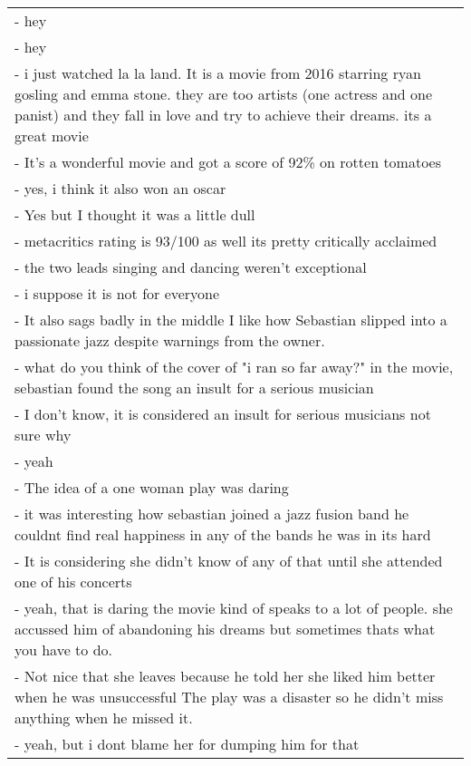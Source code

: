 \documentclass[11pt]{article}
\begin{document}
\begin{table*}[h]
    \centering
    \small
    \begin{tabular}{p{\textwidth}}
    \toprule
        - hey  \\
        - hey \\
        - i just watched la la land. It is a movie from 2016 starring ryan gosling and emma stone. they are too artists (one actress and one panist) and they fall in love and try to achieve their dreams. its a great movie \\
        - It's a wonderful movie and got a score of 92\% on rotten tomatoes \\
        - yes, i think it also won an oscar \\
        - Yes but I thought it was a little dull \\
        - metacritics rating is 93/100 as well its pretty critically acclaimed \\
        - the two leads singing and dancing weren't exceptional \\
        - i suppose it is not for everyone \\
        - It also sags badly in the middle  I like how Sebastian slipped into a passionate jazz despite warnings from the owner. \\
        - what do you think of the cover of "i ran so far away?"  in the movie, sebastian found the song an insult for a serious musician \\
        - I don't know, it is considered an insult for serious musicians not sure why \\
        - yeah \\
        - The idea of a one woman play was daring \\
        - it was interesting how sebastian joined a jazz fusion band he couldnt find real happiness in any of the bands he was in its hard  \\
        - It is considering she didn't know of any of that until she attended one of his concerts \\
        - yeah, that is daring  the movie kind of speaks to a lot of people.  she accussed him of abandoning his dreams  but sometimes thats what you have to do.  \\
        - Not nice that she leaves because he told her she liked him better when he was unsuccessful The play was a disaster so he didn't miss anything when he missed it. \\
        - yeah, but i dont blame her for dumping him for that  \\

\end{tabular}
\end{table*}
\end{document}

